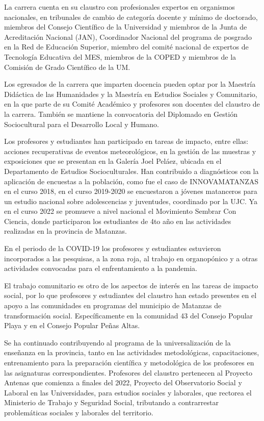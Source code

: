La carrera cuenta en su claustro con profesionales expertos en organismos nacionales, en tribunales de cambio de categoría docente y mínimo de doctorado, miembros del Consejo Científico de la Universidad y miembros de la Junta de Acreditación Nacional (JAN), Coordinador Nacional del programa de posgrado en la Red de Educación Superior, miembro del comité nacional de expertos de Tecnología Educativa del MES, miembros de la COPED y miembros de la Comisión de Grado Científico de la UM. 

Los egresados de la carrera que imparten docencia pueden optar por la Maestría Didáctica de las Humanidades y la Maestría en Estudios Sociales y Comunitario, en la que parte de su Comité Académico y profesores son docentes del claustro de la carrera. También se mantiene la convocatoria del Diplomado en Gestión Sociocultural para el Desarrollo Local y Humano.

Los profesores y estudiantes han participado en tareas de impacto, entre ellas: acciones recuperativas de eventos meteorológicos, en la gestión de las muestras y exposiciones que se presentan en la Galería Joel Peláez, ubicada en el Departamento de Estudios Socioculturales. Han contribuido a diagnósticos con la aplicación de encuestas a la población, como fue el caso de INNOVAMATANZAS en el curso 2018, en el curso 2019-2020 se encuestaron a jóvenes matanceros para un estudio nacional sobre adolescencias y juventudes, coordinado por la UJC. Ya en el curso 2022 se promueve a nivel nacional el Movimiento Sembrar Con Ciencia, donde participaron los estudiantes de 4to año en las actividades realizadas en la provincia de Matanzas. 

En el periodo de la COVID-19 los profesores y estudiantes estuvieron incorporados a las pesquisas, a la zona roja, al trabajo en organopónico y a otras actividades convocadas para el enfrentamiento a la pandemia.

El trabajo comunitario es otro de los aspectos de interés en las tareas de impacto social, por lo que profesores y estudiantes del claustro han estado presentes en el apoyo a las comunidades en programas del municipio de Matanzas de transformación social. Específicamente en la comunidad 43 del Consejo Popular Playa y en el Consejo Popular Peñas Altas. 

Se ha continuado contribuyendo al programa de la universalización de la enseñanza en la provincia, tanto en las actividades metodológicas, capacitaciones, entrenamiento para la preparación científica y metodológica de los profesores en las asignaturas correspondientes.
Profesores del claustro pertenecen al Proyecto Antenas que comienza a finales del 2022, Proyecto del Observatorio Social y Laboral en las Universidades, para estudios sociales y laborales, que rectorea el Ministerio de Trabajo y Seguridad Social, tributando a contrarrestar problemáticas sociales y laborales del territorio.

